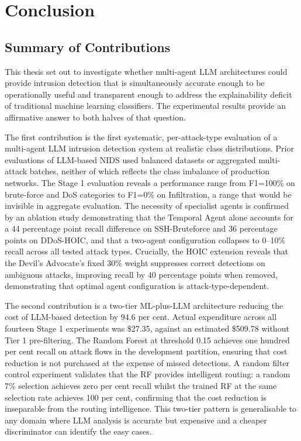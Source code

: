 \chapter{Conclusion}
\label{ch:conclusion}

\section{Summary of Contributions}

This thesis set out to investigate whether multi-agent LLM architectures could provide intrusion detection that is simultaneously accurate enough to be operationally useful and transparent enough to address the explainability deficit of traditional machine learning classifiers. The experimental results provide an affirmative answer to both halves of that question.

The first contribution is the first systematic, per-attack-type evaluation of a multi-agent LLM intrusion detection system at realistic class distributions. Prior evaluations of LLM-based NIDS used balanced datasets or aggregated multi-attack batches, neither of which reflects the class imbalance of production networks. The Stage 1 evaluation reveals a performance range from F1=100\% on brute-force and DoS categories to F1=0\% on Infiltration, a range that would be invisible in aggregate evaluation. The necessity of specialist agents is confirmed by an ablation study demonstrating that the Temporal Agent alone accounts for a 44 percentage point recall difference on SSH-Bruteforce and 36 percentage points on DDoS-HOIC, and that a two-agent configuration collapses to 0--10\% recall across all tested attack types. Crucially, the HOIC extension reveals that the Devil's Advocate's fixed 30\% weight suppresses correct detections on ambiguous attacks, improving recall by 40 percentage points when removed, demonstrating that optimal agent configuration is attack-type-dependent.

The second contribution is a two-tier ML-plus-LLM architecture reducing the cost of LLM-based detection by 94.6 per cent. Actual expenditure across all fourteen Stage 1 experiments was \$27.35, against an estimated \$509.78 without Tier 1 pre-filtering. The Random Forest at threshold 0.15 achieves one hundred per cent recall on attack flows in the development partition, ensuring that cost reduction is not purchased at the expense of missed detections. A random filter control experiment validates that the RF provides intelligent routing: a random 7\% selection achieves zero per cent recall whilst the trained RF at the same selection rate achieves 100 per cent, confirming that the cost reduction is inseparable from the routing intelligence. This two-tier pattern is generalisable to any domain where LLM analysis is accurate but expensive and a cheaper discriminator can identify the easy cases.

